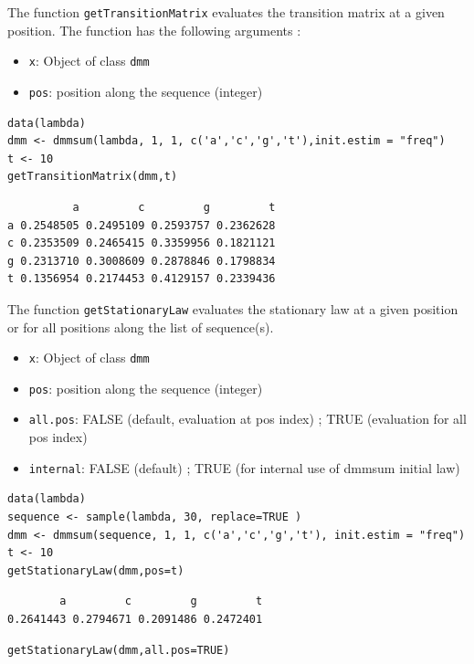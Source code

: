 \documentclass[article,nojss]{jss}\usepackage[]{graphicx}\usepackage[]{color}
\begin{document}
The function {\tt getTransitionMatrix} evaluates the transition matrix at a given position. The function has the following arguments :

%
\begin{itemize}
\item {\tt x}: Object of class {\tt dmm}
\item {\tt pos}:  position along the sequence (integer)
\end{itemize}
%

\begin{lstlisting}
data(lambda)
dmm <- dmmsum(lambda, 1, 1, c('a','c','g','t'),init.estim = "freq")
t <- 10
getTransitionMatrix(dmm,t)
\end{lstlisting}


\begin{lstlisting}
          a         c         g         t
a 0.2548505 0.2495109 0.2593757 0.2362628
c 0.2353509 0.2465415 0.3359956 0.1821121
g 0.2313710 0.3008609 0.2878846 0.1798834
t 0.1356954 0.2174453 0.4129157 0.2339436
\end{lstlisting}

The function {\tt getStationaryLaw} evaluates the stationary law at a given position or for all positions along the list of sequence(s).

%
\begin{itemize}
\item {\tt x}: Object of class {\tt dmm}
\item {\tt pos}:  position along the sequence (integer)
\item {\tt all.pos}: FALSE (default, evaluation at pos index) ; TRUE (evaluation for all pos index)
\item {\tt internal}: FALSE (default) ; TRUE (for internal use of dmmsum initial law)
\end{itemize}
%


\begin{lstlisting}
data(lambda)
sequence <- sample(lambda, 30, replace=TRUE )
dmm <- dmmsum(sequence, 1, 1, c('a','c','g','t'), init.estim = "freq")
t <- 10
getStationaryLaw(dmm,pos=t)
\end{lstlisting}

\begin{lstlisting}
        a         c         g         t
0.2641443 0.2794671 0.2091486 0.2472401
\end{lstlisting}

\begin{lstlisting}
getStationaryLaw(dmm,all.pos=TRUE)
\end{lstlisting}
\end{document}
